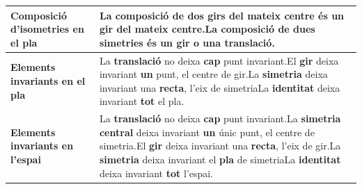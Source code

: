 \begin{center}
\begin{longtable}{|p{}|p{}|p{}|}
\cellcolor{lightgray} \textbf{Composició d'isometries en el pla} & \multicolumn{2}{|p{0.74\textwidth}|}{La composició de dos girs del mateix centre és un gir del mateix centre.\newline La composició de dues simetries és un gir o una translació.} \\ \hline 

\cellcolor{lightgray} \textbf{Elements invariants en el pla} & \multicolumn{2}{|p{0.74\textwidth}|}{La \textbf{translació} no deixa \textbf{cap} punt invariant.\newline El \textbf{gir} deixa invariant \textbf{un} punt, el centre de gir.\newline La \textbf{simetria} deixa invariant una \textbf{recta}, l'eix de simetria\newline La \textbf{identitat} deixa invariant \textbf{tot} el pla.}   \\ \hline 

\cellcolor{lightgray} \textbf{Elements invariants en l'espai} & \multicolumn{2}{|p{0.74\textwidth}|}{La \textbf{translació} no deixa \textbf{cap} punt invariant.\newline La \textbf{simetria central} deixa invariant \textbf{un} únic punt, el centre de simetria.\newline El \textbf{gir} deixa invariant una \textbf{recta}, l'eix de gir.\newline La \textbf{simetria} deixa invariant el \textbf{pla} de simetria\newline La \textbf{identitat} deixa invariant \textbf{tot} l'espai.} \\ \hline 

\end{longtable}
 
\end{center}